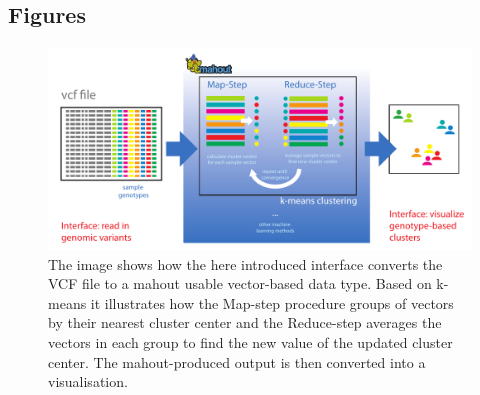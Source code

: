 \documentclass[twocolumn]{bmcart}%
\begin{document}
\begin{backmatter}




\section*{Figures}
  \begin{figure}[h!]
  \includegraphics[type=pdf,ext=.pdf,read=.pdf, scale=0.40]{images/signature}
  \caption{
      The image shows how the here introduced interface converts the VCF file to a mahout usable vector-based data type. Based on k-means it illustrates how the Map-step procedure groups of vectors by their nearest cluster center and the Reduce-step averages the vectors in each group to find the new value of the updated cluster center. The mahout-produced output is then converted into a visualisation.}
      \end{figure}



\end{backmatter}
\end{document}
